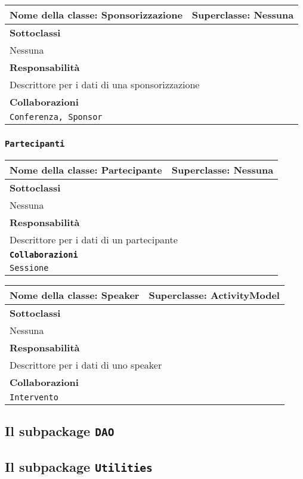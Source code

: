 \begin{table}[h!]
\centering
\begin{tabular}{|l|l|}
\hline
\textbf{Nome della classe:} Sponsorizzazione & \textbf{Superclasse}: Nessuna \\ \hline
\multicolumn{2}{|l|}{\textbf{Sottoclassi}}\\
\multicolumn{2}{|l|}{Nessuna} \\ \hline
\multicolumn{2}{|l|}{\textbf{Responsabilità}}\\
\multicolumn{2}{|l|}{Descrittore per i dati di una sponsorizzazione} \\ \hline
\multicolumn{2}{|l|}{\textbf{Collaborazioni}}\\
\multicolumn{2}{|l|}{\texttt{Conferenza, Sponsor}} \\ \hline
\end{tabular}
\end{table}

\newpage
\subsubsection{\texttt{Partecipanti}}
\begin{table}[h!]
\centering
\begin{tabular}{|l|l|}
\hline
\textbf{Nome della classe:} Partecipante & \textbf{Superclasse}: Nessuna \\ \hline
\multicolumn{2}{|l|}{\textbf{Sottoclassi}}\\
\multicolumn{2}{|l|}{Nessuna} \\ \hline
\multicolumn{2}{|l|}{\textbf{Responsabilità}}\\
\multicolumn{2}{|l|}{Descrittore per i dati di un partecipante} \\ \hline
\multicolumn{2}{|l|}{\textbf{\texttt{Collaborazioni}}}\\
\multicolumn{2}{|l|}{\texttt{Sessione}} \\ \hline
\end{tabular}
\end{table}

\begin{table}[h!]
\centering
\begin{tabular}{|l|l|}
\hline
\textbf{Nome della classe:} Speaker & \textbf{Superclasse}: ActivityModel \\ \hline
\multicolumn{2}{|l|}{\textbf{Sottoclassi}}\\
\multicolumn{2}{|l|}{Nessuna} \\ \hline
\multicolumn{2}{|l|}{\textbf{Responsabilità}}\\
\multicolumn{2}{|l|}{Descrittore per i dati di uno speaker} \\ \hline
\multicolumn{2}{|l|}{\textbf{Collaborazioni}}\\
\multicolumn{2}{|l|}{\texttt{Intervento}} \\ \hline
\end{tabular}
\end{table}

\newpage
\subsection{Il subpackage \texttt{DAO}}
\subsection{Il subpackage \texttt{Utilities}}